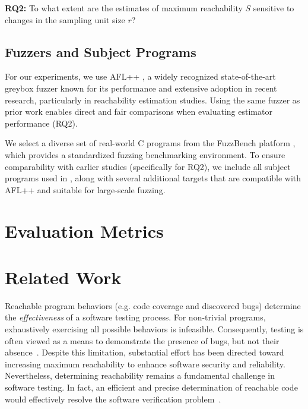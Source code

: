 \documentclass[conference,anonymous,review]{IEEEtran}
\begin{document}
\noindent\textbf{RQ2:} To what extent are the estimates of maximum reachability
$S$ sensitive to changes in the sampling unit size $r$?

\subsection{Fuzzers and Subject Programs}

For our experiments, we use AFL++ \cite{fioraldi2020AFL++}, a widely recognized state-of-the-art greybox fuzzer known for its performance and extensive adoption in recent research, particularly in reachability estimation studies. Using the same fuzzer as prior work enables direct and fair comparisons when evaluating estimator performance (RQ2).

We select a diverse set of real-world C programs from the FuzzBench platform \cite{metzman2021fuzzbench}, which provides a standardized fuzzing benchmarking environment. To ensure comparability with earlier studies (specifically for RQ2), we include all subject programs used in \cite{liyanage2023reachable}, along with several additional targets that are compatible with AFL++ and suitable for large-scale fuzzing.

\section{Evaluation Metrics}

\section{Related Work}
\label{sec:related}

Reachable program behaviors (e.g. code coverage and discovered bugs) determine the \emph{effectiveness} of a software testing process. For non-trivial programs, exhaustively exercising all possible behaviors is infeasible. Consequently, testing is often viewed as a means to demonstrate the presence of bugs, but not their absence~\cite{dijkstra2022reliability}. Despite this limitation, substantial effort has been directed toward increasing maximum reachability to enhance software security and reliability. Nevertheless, determining reachability remains a fundamental challenge in software testing. In fact, an efficient and precise determination of reachable code would effectively resolve the software verification problem~\cite{liyanage2023reachable}. 
\end{document}
